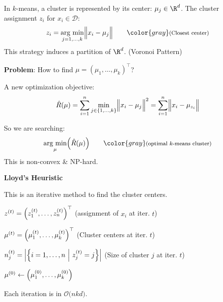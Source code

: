 In $k$-means, a cluster is represented by its center: $\mu_j \in \R^d$.
The cluster assignment $z_i$ for $x_i \in \mathcal{D}$:
$$
    z_i = \underset{j=1,\ldots,k}{\text{arg min}}\Bigl\Vert x_i-\mu_j \Bigr\Vert    \qquad {\color{gray}\footnotesize \text{(Closest center)} }
$$
{\footnotesize
    \remark This strategy induces a partition of $\R^d$. (Voronoi Pattern)
}

\textbf{Problem}: How to find $\mu = (\mu_1,\ldots,\mu_k)^\top$?

A new optimization objective:
$$
    \hat{R}(\mu) = \sum_{i=1}^n \underset{j\in\{1,\ldots,k\}}{\min}\Bigl\Vert x_i-\mu_j \Bigr\Vert^2 = \sum_{i=1}^n \Bigl\Vert x_i-\mu_{z_i} \Bigr\Vert
$$

So we are searching:
$$
    \underset{\mu}{\text{arg min}} \Bigl( \hat{R}(\mu) \Bigr) \qquad {\color{gray}\footnotesize \text{(optimal $k$-means cluster)}}
$$
\remark This is non-convex \& NP-hard.

\method \textbf{Lloyd's Heuristic}

This is an iterative method to find the cluster centers.

{\footnotesize
     $z^{(t)} = \Bigl( z_1^{(t)},\ldots,z_n^{(t)} \Bigr)^\top$ \color{gray}(assignment of $x_i$ at iter. $t$)\color{black}

     $\mu^{(t)} = \Bigl( \mu_1^{(t)},\ldots,\mu_k^{(t)}\Bigr)^\top$ \color{gray}(Cluster centers at iter. $t$)\color{black}

     $n_j^{(t)} = \Bigl| \Bigl\{ i=1,\ldots,n\ \Big|\ z_j^{(t)}=j \Bigr\} \Bigr|$ \color{gray}(Size of cluster $j$ at iter. $t$)\color{black}
}

\begin{algorithm}
    \caption{Lloyd's Heuristic}
    $\mu^{(0)}\gets \Bigl( \mu_1^{(0)},\ldots,\mu_k^{(0)} \Bigr)$\;
\end{algorithm}
{\footnotesize
    \remark Each iteration is in $\mathcal{O}\bigl( nkd \bigr)$.
}


